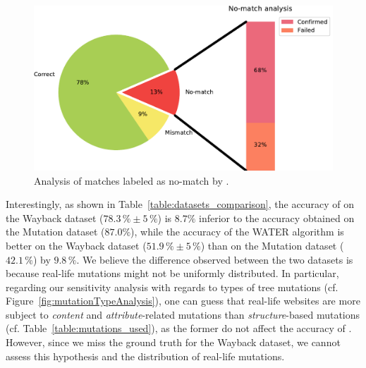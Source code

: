 \begin{figure}[]
  \centering
  \includegraphics[width=.75\linewidth]{erratum/nomatch-analysis}
  \caption{Analysis of matches labeled as \textsf{no-match} by \erratum{}.}
  \label{fig:nomatch-analysis}
\end{figure}


\vspace{6pt}
Interestingly, as shown in Table~\ref{table:datasets_comparison}, the accuracy of \erratum on the {\sc Wayback} dataset ($78.3\,\% \pm 5\,\%$) is $8.7\%$ inferior to the accuracy obtained on the {\sc Mutation} dataset ($87.0\%$), while the accuracy of the WATER algorithm is better on the {\sc Wayback} dataset ($51.9\,\% \pm 5\,\%$) than on the {\sc Mutation} dataset ($42.1\,\%$) by $9.8\,\%$.
We believe the difference observed between the two datasets is because real-life mutations might not be uniformly distributed.
In particular, regarding our sensitivity analysis with regards to types of tree mutations (cf. Figure~\ref{fig:mutationTypeAnalysis}), one can guess that real-life websites are more subject to \emph{content} and \emph{attribute}-related mutations than \emph{structure}-based mutations (cf. Table~\ref{table:mutations_used}), as the former do not affect the accuracy of \erratum{}.
However, since we miss the ground truth for the {\sc Wayback} dataset, we cannot assess this hypothesis and the distribution of real-life mutations.

\begin{table}[h]
    \caption{Accuracy summary across datasets.}
    \label{table:datasets_comparison}
    \centering
\end{table}

